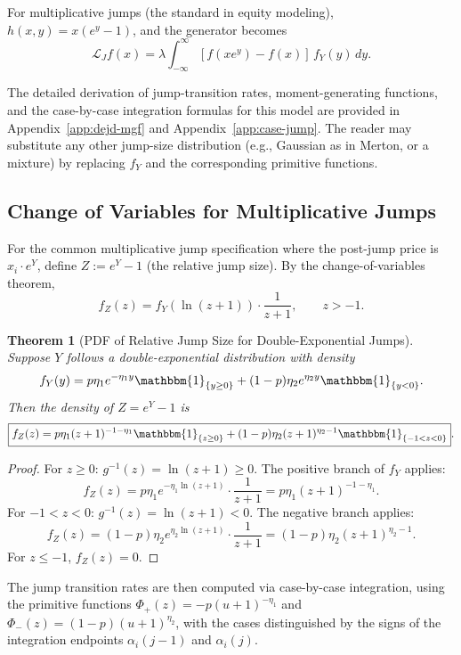 \documentclass[11pt,a4paper,openany]{book}
\theoremstyle{definition}
\theoremstyle{plain}
\newtheorem{theorem}{Theorem}[chapter]
\theoremstyle{remark}
\newcommand{\1}{\mathbbm{1}}
\begin{document}
For multiplicative jumps (the standard in equity modeling), $h(x,y) = x(e^{y} - 1)$, and the generator becomes
\[
\mathcal{L}_{J} f(x) = \lambda \int_{-\infty}^{\infty} [f(x e^{y}) - f(x)] \, f_{Y}(y) \, dy.
\]

The detailed derivation of jump-transition rates, moment-generating functions, and the case-by-case integration formulas for this model are provided in Appendix~\ref{app:dejd-mgf} and Appendix~\ref{app:case-jump}. The reader may substitute any other jump-size distribution (e.g., Gaussian as in Merton, or a mixture) by replacing $f_{Y}$ and the corresponding primitive functions.

\subsection{Change of Variables for Multiplicative Jumps}

For the common multiplicative jump specification where the post-jump price is $x_{i} \cdot e^{Y}$, define $Z := e^{Y} - 1$ (the relative jump size). By the change-of-variables theorem,
\[
f_{Z}(z) = f_{Y}(\ln(z+1)) \cdot \frac{1}{z+1}, \qquad z > -1.
\]

\begin{theorem}[PDF of Relative Jump Size for Double-Exponential Jumps]
Suppose $Y$ follows a double-exponential distribution with density
\[
f_{Y}(y) = p \eta_{1} e^{-\eta_{1} y} \1_{\{y \geq 0\}} + (1-p) \eta_{2} e^{\eta_{2} y} \1_{\{y < 0\}}.
\]
Then the density of $Z = e^{Y} - 1$ is
\[
\boxed{f_{Z}(z) = p \eta_{1} (z+1)^{-1-\eta_{1}} \1_{\{z \geq 0\}} + (1-p) \eta_{2} (z+1)^{\eta_{2}-1} \1_{\{-1 < z < 0\}}}.
\]
\end{theorem}

\begin{proof}
For $z \geq 0$: $g^{-1}(z) = \ln(z+1) \geq 0$. The positive branch of $f_{Y}$ applies:
\[
f_{Z}(z) = p \eta_{1} e^{-\eta_{1} \ln(z+1)} \cdot \frac{1}{z+1} = p \eta_{1} (z+1)^{-1-\eta_{1}}.
\]
For $-1 < z < 0$: $g^{-1}(z) = \ln(z+1) < 0$. The negative branch applies:
\[
f_{Z}(z) = (1-p) \eta_{2} e^{\eta_{2} \ln(z+1)} \cdot \frac{1}{z+1} = (1-p) \eta_{2} (z+1)^{\eta_{2}-1}.
\]
For $z \leq -1$, $f_{Z}(z) = 0$.
\end{proof}

The jump transition rates are then computed via case-by-case integration, using the primitive functions $\Phi_{+}(z) = -p (u+1)^{-\eta_{1}}$ and $\Phi_{-}(z) = (1-p)(u+1)^{\eta_{2}}$, with the cases distinguished by the signs of the integration endpoints $\alpha_{i}(j-1)$ and $\alpha_{i}(j)$.
\end{document}
